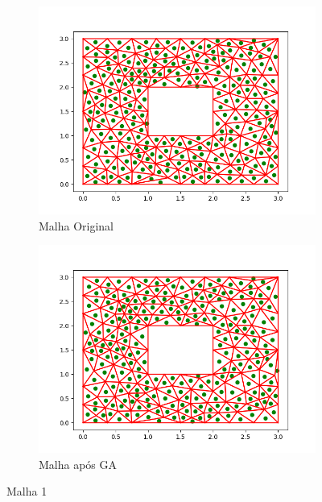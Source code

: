 \documentclass[review]{elsarticle}
\begin{document}
\begin{figure}[]
    \begin{subfigure}{1\textwidth}
        \centering
        \includegraphics[width=1\textwidth]{malha1-original.png}
        \caption{Malha Original}
        \label{fig:malha-original}
    \end{subfigure}
    \begin{subfigure}{1\textwidth}
        \centering
        \includegraphics[width=1\textwidth]{malha1-ga.png}
        \caption{Malha após GA}
        \label{fig:malha-ga}
    \end{subfigure}

    \caption{Malha 1}
    \label{fig:malha1}
\end{figure}
\end{document}
